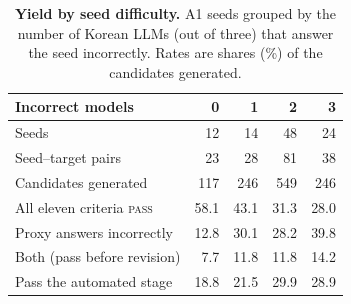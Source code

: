 \begin{table}[t]
\centering
\small
\setlength{\tabcolsep}{4pt}
\caption{\textbf{Yield by seed difficulty.}
A1 seeds grouped by the number of Korean LLMs (out of three) that answer the seed incorrectly.
Rates are shares (\%) of the candidates generated.}
\label{tab:seed_difficulty}
\begin{tabular}{@{}lrrrr@{}}
\toprule
\textbf{Incorrect models} & \textbf{0} & \textbf{1} & \textbf{2} & \textbf{3} \\
\midrule
Seeds                                & 12   & 14   & 48   & 24   \\
Seed--target pairs                   & 23   & 28   & 81   & 38   \\
Candidates generated                 & 117  & 246  & 549  & 246  \\
\midrule
All eleven criteria \textsc{pass}    & 58.1 & 43.1 & 31.3 & 28.0 \\
Proxy answers incorrectly            & 12.8 & 30.1 & 28.2 & 39.8 \\
Both (pass before revision)          & 7.7  & 11.8 & 11.8 & 14.2 \\
Pass the automated stage             & 18.8 & 21.5 & 29.9 & 28.9 \\
\bottomrule
\end{tabular}
\end{table}